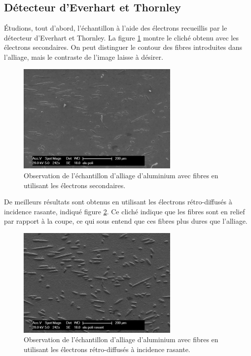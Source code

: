 \documentclass[a4paper,12pt]{article}
\newcommand\ett{Everhart et Thornley\xspace}
\begin{document}
\subsection{Détecteur d'\ett}

Étudions, tout d'abord, l'échantillon à l'aide des électrons recueillis par le détecteur d'\ett. 
La figure \ref{fig:alu_poli_es} montre le cliché obtenu avec les électrons secondaires.
On peut distinguer le contour des fibres introduites dans l'alliage, mais le contraste de l'image laisse 
à désirer.

\begin{figure}[h]
\centering
\includegraphics[width=0.7\textwidth]{images/alu_es.png}
\caption{Observation de l'échantillon d'alliage d'aluminium avec fibres en utilisant les électrons secondaires.}
\label{fig:alu_poli_es}
\end{figure}

De meilleurs résultats sont obtenus en utilisant les électrons rétro-diffusés à incidence rasante, indiqué figure \ref{fig:alu_poli_er_rasant}.
Ce cliché indique que les fibres sont en relief par rapport à la coupe, ce qui sous entend que ces fibres plus dures que l'alliage.

\begin{figure}[h!]
\centering
\includegraphics[width=0.7\textwidth]{images/alu_er_rasant.png}
\caption{Observation de l'échantillon d'alliage d'aluminium avec fibres en utilisant les électrons rétro-diffusés à incidence rasante.}
\label{fig:alu_poli_er_rasant}
\end{figure}
\end{document}
